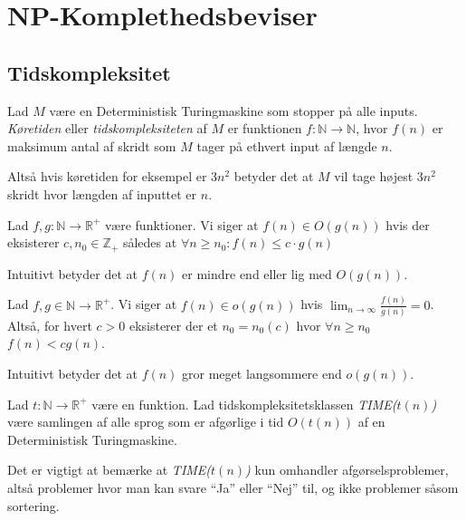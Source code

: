 \chapter{NP-Komplethedsbeviser}

\section{Tidskompleksitet}%
\label{subsec:label}

\begin{definition}
	Lad $M$ være en Deterministisk Turingmaskine som stopper på alle inputs. \textit{Køretiden} eller \textit{tidskompleksiteten} af $M$ er funktionen $f : \mathbb{N} \rightarrow \mathbb{N}$, hvor $f(n)$ er maksimum antal af skridt som $M$ tager på ethvert input af længde $n$.
\end{definition}

Altså hvis køretiden for eksempel er $3n^{2}$ betyder det at $M$ vil tage højest $3n^{2}$ skridt hvor længden af inputtet er $n$.

\begin{definition}
	Lad $f,g : \mathbb{N} \rightarrow \mathbb{R}^{+}$ være funktioner. Vi siger at $f(n) \in O(g(n))$ hvis der eksisterer $c, n_{0} \in \mathbb{Z}_{+}$ således at $\forall n \ge n_{0} : f(n) \le c \cdot g(n)$
\end{definition}

Intuitivt betyder det at $f(n)$ er mindre end eller lig med $O(g(n))$.

\begin{definition}
	Lad $f, g  \in \mathbb{N}  \rightarrow \mathbb{R}^{+}$. Vi siger at $f(n) \in o(g(n))$ hvis $\lim_{n \to \infty} \frac{f(n)}{g(n)} = 0$. Altså, for hvert $c > 0$ eksisterer der et $n_{0} = n_{0}(c)$ hvor $\forall n \ge n_{0} $ $f(n)  < cg(n)$.
\end{definition}

Intuitivt betyder det at $f(n)$ gror meget langsommere end $o(g(n))$.

\begin{definition}
	Lad $t : \mathbb{N} \rightarrow \mathbb{R}^{+}$ være en funktion. Lad tidskompleksitetsklassen \textit{TIME($t(n)$)} være samlingen af alle sprog som er afgørlige i tid $O(t(n))$ af en Deterministisk Turingmaskine.
\end{definition}

Det er vigtigt at bemærke at \textit{TIME($t(n)$)} kun omhandler afgørselsproblemer, altså problemer hvor man kan svare ``Ja'' eller ``Nej'' til, og ikke problemer såsom sortering.

